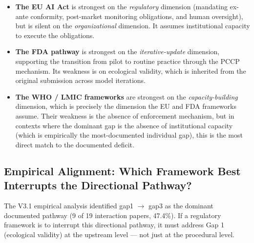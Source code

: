 \begin{itemize}
  \item \textbf{The EU AI Act} is strongest on the
        \textit{regulatory} dimension
        (mandating ex-ante conformity, post-market
        monitoring obligations, and human oversight),
        but is silent on the \textit{organizational}
        dimension. It assumes institutional capacity to
        execute the obligations.
  \item \textbf{The FDA pathway} is strongest on the
        \textit{iterative-update} dimension, supporting
        the transition from pilot to routine practice
        through the PCCP mechanism. Its weakness is on
        ecological validity, which is inherited from the
        original submission across model iterations.
  \item \textbf{The WHO / LMIC frameworks} are strongest
        on the \textit{capacity-building} dimension,
        which is precisely the dimension the EU and FDA
        frameworks assume. Their weakness is the
        absence of enforcement mechanism, but in
        contexts where the dominant gap is the absence
        of institutional capacity (which is empirically
        the most-documented individual gap), this is
        the most direct match to the documented deficit.
\end{itemize}

\subsection{Empirical Alignment: Which Framework Best Interrupts the Directional Pathway?}
\label{sec:pathway_interruption}

The V3.1 empirical analysis identified gap1 $\rightarrow$ gap3
as the dominant documented pathway (9 of 19 interaction papers,
47.4\%). If a regulatory framework is to interrupt this
directional pathway, it must address Gap 1 (ecological validity)
at the upstream level --- not just at the procedural level.

